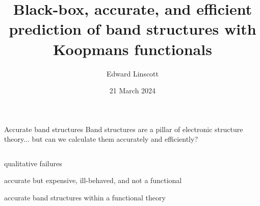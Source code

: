 \documentclass[xcolor=table,aspectratio=169]{beamer}
\author{Edward Linscott}
\institute{PSI}
\date{21 March 2024}
\title{Black-box, accurate, and efficient prediction of band structures with Koopmans functionals}
\numberwithin{equation}{section}
\begin{document}

\frame{\titlepage}

\begin{frame}{Accurate band structures}
   Band structures are a pillar of electronic structure theory... but can we calculate them accurately and efficiently?

   \vspace{-1ex}

   \begin{columns}
      \begin{column}{0.5\textwidth}
         \begin{description}[<+(1)->]
            \item[DFT] qualitative failures
            \item[GW] accurate but expensive, ill-behaved, and not a functional
            \item[Koopmans functionals] accurate band structures within a functional theory
         \end{description}
\end{column}
\end{columns}
\end{frame}
\end{document}
